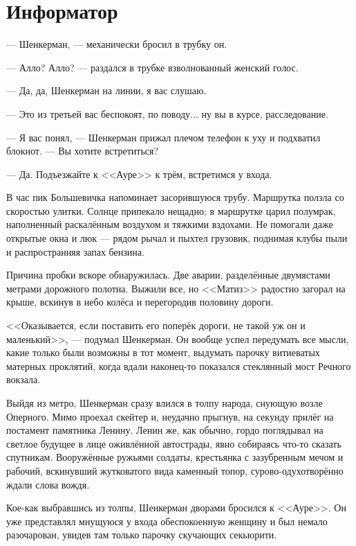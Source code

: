 \documentclass[a4paper,10pt,fleqn]{book}\usepackage{polyglossia}\setdefaultlanguage{english}\setotherlanguage{russian}\defaultfontfeatures{Ligatures=TeX,Mapping=tex-text} \usepackage{xcolor}\definecolor{lightgray}{HTML}{bbbbbb}\color{lightgray}\newcommand{\ml}[3]{\textcolor{black}{#3}}
\newcommand{\asterism}{\vspace{1em}{\centering\Large\bfseries$\ast~\ast~\ast$\par}\vspace{1em}}
\begin{document}
\section{Информатор}

--- Шенкерман, --- механически бросил в трубку он.

--- Алло? Алло? --- раздался в трубке взволнованный женский голос.

--- Да, да, Шенкерман на линии, я вас слушаю.

--- Это из третьей вас беспокоят, по поводу... ну вы в курсе, расследование.

--- Я вас понял, --- Шенкерман прижал плечом телефон к уху и подхватил блокнот.
--- Вы хотите встретиться?

--- Да.
Подъезжайте к <<Ауре>> к трём, встретимся у входа.

\asterism

В час пик Большевичка напоминает засорившуюся трубу.
Маршрутка ползла со скоростью улитки.
Солнце припекало нещадно;
в маршрутке царил полумрак, наполненный раскалённым воздухом и тяжкими вздохами.
Не помогали даже открытые окна и люк --- рядом рычал и пыхтел грузовик, поднимая клубы пыли и распространняя запах бензина.

Причина пробки вскоре обнаружилась.
Две аварии, разделённые двумястами метрами дорожного полотна.
Выжили все, но <<Матиз>> радостно загорал на крыше, вскинув в небо колёса и перегородив половину дороги.

<<Оказывается, если поставить его поперёк дороги, не такой уж он и маленький>>, --- подумал Шенкерман.
Он вообще успел передумать все мысли, какие только были возможны в тот момент, выдумать парочку витиеватых матерных проклятий, когда вдали наконец-то показался стеклянный мост Речного вокзала.

Выйдя из метро, Шенкерман сразу влился в толпу народа, снующую возле Оперного.
Мимо проехал скейтер и, неудачно прыгнув, на секунду прилёг на постамент памятника Ленину.
Ленин же, как обычно, гордо поглядывал на светлое будущее в лице оживлённой автострады, явно собираясь что-то сказать спутникам.
Вооружённые ружьями солдаты, крестьянка с зазубренным мечом и рабочий, вскинувший жутковатого вида каменный топор, сурово-одухотворённо ждали слова вождя.

Кое-как выбравшись из толпы, Шенкерман дворами бросился к <<Ауре>>.
Он уже представлял мнущуюся у входа обеспокоенную женщину и был немало разочарован, увидев там только парочку скучающих секьюрити.
\end{document}
